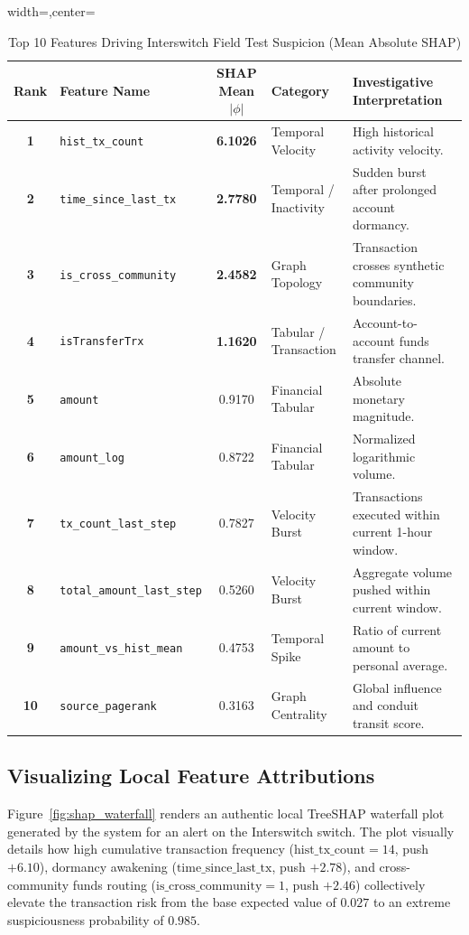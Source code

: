\begin{table}[hbt!]
\centering
\caption{Top 10 Features Driving Interswitch Field Test Suspicion (Mean Absolute SHAP)}
\label{tab:shap_importance}
\begin{adjustbox}{width=\textwidth,center=\textwidth}
\begin{tabular}{|c|l|c|l|p{6.5cm}|}
\hline
\rowcolor{gray!40}
\textbf{Rank} & \textbf{Feature Name} & \textbf{SHAP Mean $|\phi|$} & \textbf{Category} & \textbf{Investigative Interpretation} \\
\hline
\textbf{1} & \texttt{hist\_tx\_count} & \textbf{6.1026} & Temporal Velocity & High historical activity velocity. \\
\hline
\textbf{2} & \texttt{time\_since\_last\_tx} & \textbf{2.7780} & Temporal / Inactivity & Sudden burst after prolonged account dormancy. \\
\hline
\textbf{3} & \texttt{is\_cross\_community} & \textbf{2.4582} & Graph Topology & Transaction crosses synthetic community boundaries. \\
\hline
\textbf{4} & \texttt{isTransferTrx} & \textbf{1.1620} & Tabular / Transaction & Account-to-account funds transfer channel. \\
\hline
\textbf{5} & \texttt{amount} & 0.9170 & Financial Tabular & Absolute monetary magnitude. \\
\hline
\textbf{6} & \texttt{amount\_log} & 0.8722 & Financial Tabular & Normalized logarithmic volume. \\
\hline
\textbf{7} & \texttt{tx\_count\_last\_step} & 0.7827 & Velocity Burst & Transactions executed within current 1-hour window. \\
\hline
\textbf{8} & \texttt{total\_amount\_last\_step} & 0.5260 & Velocity Burst & Aggregate volume pushed within current window. \\
\hline
\textbf{9} & \texttt{amount\_vs\_hist\_mean} & 0.4753 & Temporal Spike & Ratio of current amount to personal average. \\
\hline
\textbf{10} & \texttt{source\_pagerank} & 0.3163 & Graph Centrality & Global influence and conduit transit score. \\
\hline
\end{tabular}
\end{adjustbox}
\end{table}

\subsection{Visualizing Local Feature Attributions}
Figure~\ref{fig:shap_waterfall} renders an authentic local TreeSHAP waterfall plot generated by the system for an alert on the Interswitch switch. The plot visually details how high cumulative transaction frequency ($\text{hist\_tx\_count} = 14$, push $+6.10$), dormancy awakening ($\text{time\_since\_last\_tx}$, push $+2.78$), and cross-community funds routing ($\text{is\_cross\_community} = 1$, push $+2.46$) collectively elevate the transaction risk from the base expected value of $0.027$ to an extreme suspiciousness probability of $0.985$.

